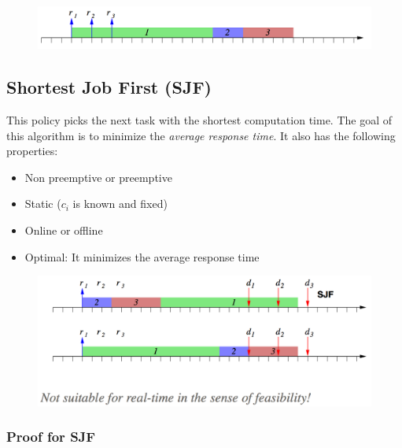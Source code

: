\documentclass{hw}
\begin{document}
\begin{figure}[H]
  \centering
  \includegraphics[scale=.6]{img/fcfs2}
\end{figure}

\subsection{Shortest Job First (SJF)}
This policy picks the next task with the shortest computation time. The goal of 
this algorithm is to minimize the \emph{average response time}. It also has the
following properties:
\begin{itemize}
  \item Non preemptive or preemptive
  \item Static ($c_{i}$ is known and fixed)
  \item Online or offline
  \item Optimal: It minimizes the average response time
\end{itemize}

\begin{figure}[H]
  \centering
  \includegraphics[scale=.6]{img/sjf}
\end{figure}

\subsubsection{Proof for SJF}
\end{document}
